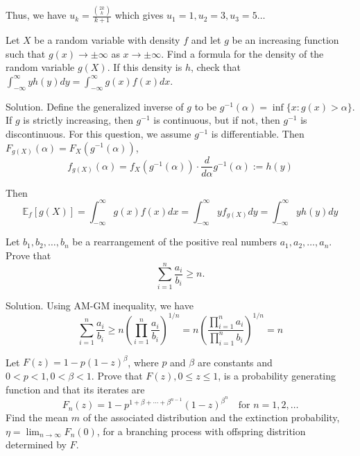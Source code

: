 Thus, we have $u_k = \frac{\binom{2k}{k}}{k+1} $ which gives $u_1 = 1,u_2 = 3,u_3=5\dots$


\item Let $X$ be a random variable with density $f$ and let $g$ be an increasing function such that $g(x)\to\pm\infty$ as $x\to\pm\infty$. Find a formula for the density of the random variable $g(X)$. If this density is $h$, check that $\int^\infty_{-\infty}yh(y)dy=\int^\infty_{-\infty}g(x)f(x)dx$.



Solution. Define the generalized inverse of $g$ to be $g^{-1}(\alpha)=\inf\{x:g(x)>\alpha\}$. If $g$ is strictly increasing, then $g^{-1}$ is continuous, but if not, then $g^{-1}$ is discontinuous. For this question, we assume $g^{-1}$ is differentiable. Then $F_{g(X)}(\alpha)=F_X(g^{-1}(\alpha))$,
\begin{equation}
f_{g(X)}(\alpha)=f_X(g^{-1}(\alpha))\cdot\frac{d}{d\alpha}g^{-1}(\alpha):=h(y)
\end{equation}

Then
\begin{equation}
\mathbb{E}_f[g(X)] = \int^\infty_{-\infty} g(x)f(x)dx = \int^\infty_{-\infty}yf_{g(X)}dy = \int^\infty_{-\infty}yh(y)dy
\end{equation}


\item Let $b_1,b_2,\dots,b_n$ be a rearrangement of the positive real numbers $a_1,a_2,\dots,a_n$. Prove that 
\begin{equation}
\sum^n_{i=1}\frac{a_i}{b_i}\geq n.
\end{equation}



Solution. Using AM-GM inequality, we have
\begin{equation}
\sum^n_{i=1}\frac{a_i}{b_i} \geq n\left(\prod^n_{i=1}\frac{a_i}{b_i}\right)^{1/n} = n\left(\frac{\prod^n_{i=1}a_i}{\prod^n_{i=1}b_i}\right)^{1/n}=n
\end{equation}


\item Let $F(z)=1-p(1-z)^\beta$, where $p$ and $\beta$ are constants and $0<p<1, 0<\beta<1$. Prove that $F(z),0\leq z\leq 1$, is a probability generating function and that its iterates are
\begin{equation}
F_n(z)=1-p^{1+\beta+\cdots+\beta^{n-1}}(1-z)^{\beta^n} \quad \text{for }n=1,2,\dots
\end{equation} 
Find the mean $m$ of the associated distribution and the extinction probability, $\eta=\lim_{n\to\infty}F_n(0)$, for a branching process with offspring distrition determined by $F$.



